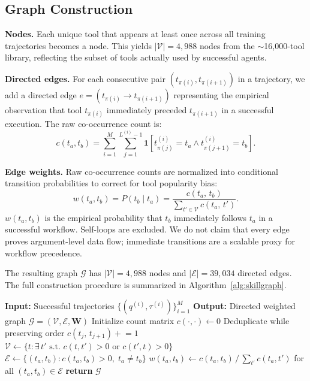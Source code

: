 \documentclass[lettersize,journal]{IEEEtran}
\begin{document}
\subsection{Graph Construction}

\textbf{Nodes.}
Each unique tool that appears at least once across all training trajectories becomes a node.
This yields $|\mathcal{V}| = 4{,}988$ nodes from the $\sim$16,000-tool library, reflecting the subset of tools actually used by successful agents.

\textbf{Directed edges.}
For each consecutive pair $(t_{\pi(i)}, t_{\pi(i+1)})$ in a trajectory, we add a directed edge $e = (t_{\pi(i)} \to t_{\pi(i+1)})$ representing the empirical observation that tool $t_{\pi(i)}$ immediately preceded $t_{\pi(i+1)}$ in a successful execution.
The raw co-occurrence count is:
\begin{equation}
    c(t_a, t_b) = \sum_{i=1}^{M} \sum_{j=1}^{L^{(i)}-1}
    \mathbf{1}\!\left[t_{\pi(j)}^{(i)} = t_a \wedge t_{\pi(j+1)}^{(i)} = t_b\right].
    \label{eq:cocount}
\end{equation}

\textbf{Edge weights.}
Raw co-occurrence counts are normalized into conditional transition probabilities to correct for tool popularity bias:
\begin{equation}
    w(t_a, t_b) = P(t_b \mid t_a) = \frac{c(t_a,\, t_b)}{\sum_{t' \in \mathcal{V}} c(t_a,\, t')}.
    \label{eq:transweight}
\end{equation}
$w(t_a, t_b)$ is the empirical probability that $t_b$ immediately follows $t_a$ in a successful workflow.
Self-loops are excluded.
We do not claim that every edge proves argument-level data flow; immediate transitions are a scalable proxy for workflow precedence.

The resulting graph $\mathcal{G}$ has $|\mathcal{V}| = 4{,}988$ nodes and $|\mathcal{E}| = 39{,}034$ directed edges.
The full construction procedure is summarized in Algorithm~\ref{alg:skillgraph}.

\begin{algorithm}[t]
\caption{SkillGraph Construction}
\label{alg:skillgraph}
\begin{algorithmic}
\STATE \textbf{Input:} Successful trajectories $\{(q^{(i)}, \tau^{(i)})\}_{i=1}^{M}$
\STATE \textbf{Output:} Directed weighted graph $\mathcal{G} = (\mathcal{V}, \mathcal{E}, \mathbf{W})$
\STATE Initialize count matrix $c(\cdot,\cdot) \leftarrow 0$
    \STATE Deduplicate while preserving order
        \STATE $c(t_j,\, t_{j+1}) \mathrel{+}= 1$
    \ENDFOR
\ENDFOR
\STATE $\mathcal{V} \leftarrow \{t : \exists\, t' \text{ s.t. } c(t,t') > 0 \text{ or } c(t',t) > 0\}$
\STATE $\mathcal{E} \leftarrow \{(t_a, t_b) : c(t_a, t_b) > 0,\; t_a \neq t_b\}$
\STATE $w(t_a, t_b) \leftarrow c(t_a, t_b)\, /\, \textstyle\sum_{t'} c(t_a, t')$ for all $(t_a,t_b) \in \mathcal{E}$
\STATE \textbf{return} $\mathcal{G}$
\end{algorithmic}
\end{algorithm}
\end{document}
